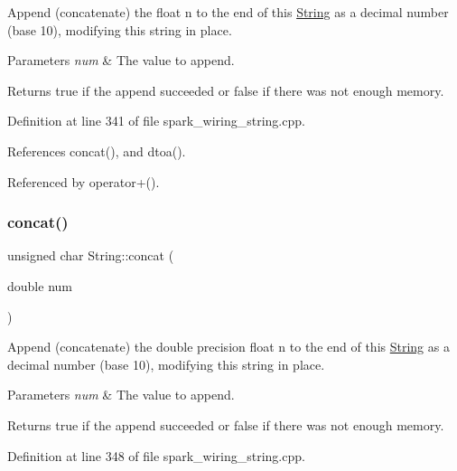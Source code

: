 Append (concatenate) the float n to the end of this \hyperlink{class_string}{String} as a decimal number (base 10), modifying this string in place. 


\begin{DoxyParams}{Parameters}
{\em num} & The value to append.\\
\hline
\end{DoxyParams}
\begin{DoxyReturn}{Returns}
true if the append succeeded or false if there was not enough memory. 
\end{DoxyReturn}


Definition at line 341 of file spark\+\_\+wiring\+\_\+string.\+cpp.



References concat(), and dtoa().



Referenced by operator+().

\mbox{\label{class_string_ab1e52143c6057122a71db07ed1c7fb0e}} 
\subsubsection{\texorpdfstring{concat()}{concat()}\hspace{0.1cm}{\footnotesize\ttfamily [11/12]}}
{\footnotesize\ttfamily unsigned char String\+::concat (\begin{DoxyParamCaption}\item[{double}]{num }\end{DoxyParamCaption})}



Append (concatenate) the double precision float n to the end of this \hyperlink{class_string}{String} as a decimal number (base 10), modifying this string in place. 


\begin{DoxyParams}{Parameters}
{\em num} & The value to append.\\
\hline
\end{DoxyParams}
\begin{DoxyReturn}{Returns}
true if the append succeeded or false if there was not enough memory. 
\end{DoxyReturn}


Definition at line 348 of file spark\+\_\+wiring\+\_\+string.\+cpp.



